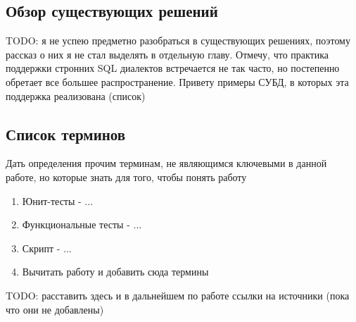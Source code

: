 \subsection{Обзор существующих решений}
TODO: я не успею предметно разобраться в существующих решениях, поэтому рассказ о них я не стал выделять в отдельную главу. Отмечу, что практика поддержки стронних SQL диалектов встречается не так часто, но постепенно обретает все большее распространение. Привету примеры СУБД, в которых эта поддержка реализована (список)

\subsection{Список терминов}
Дать определения прочим терминам, не являющимся ключевыми в данной работе, но которые знать для того, чтобы понять работу
\begin{enumerate}
    \item Юнит-тесты - ...
    \item Функциональные тесты - ...
    \item Скрипт - ...
    \item Вычитать работу и добавить сюда термины
\end{enumerate}

TODO: расставить здесь и в дальнейшем по работе ссылки на источники (пока что они не добавлены)

\pagebreak
